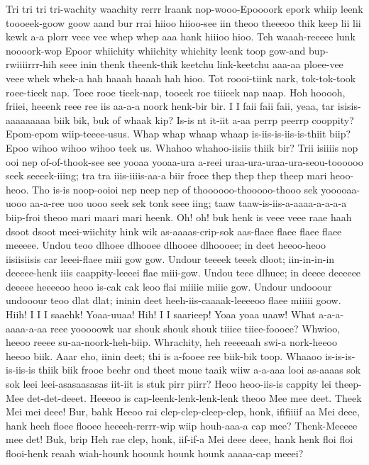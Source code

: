 \documentclass[12pt,a4paper]{article}
\begin{document}
\begin{drama}
\pistspeaks
Tri tri tri tri-wachity waachity rerrr lraank nop-wooo-Epoooork epork whiip leenk toooeek-goow goow aand bur rrai hiioo hiioo-see iin theoo theeeoo thik keep lii lii kewk a-a plorr veee vee whep whep aaa hank hiiioo hioo. Teh waaah-reeeee lunk noooork-wop Epoor whiichity whiichity whichity leenk toop gow-and bup-rwiiiirrr-hih seee inin thenk theenk-thik keetchu link-keetchu aaa-aa ploee-vee veee whek whek-a hah haaah haaah hah hioo.
\phoespeaks
Tot roooi-tiink nark, tok-tok-took roee-tieek nap. Toee rooe tieek-nap, tooeek roe tiiieek nap naap.
\pistspeaks
Hoh hooooh, friiei, heeenk reee ree iis aa-a-a noork henk-bir bir.
\euelspeaks
I I faii faii faii, yeaa, tar isisis-aaaaaaaaa biik bik, buk of whaak kip? Is-is nt it-iit a-aa perrp peerrp cooppity?
\pistspeaks
Epom-epom wiip-teeee-usus. Whap whap whaap whaap is-iis-is-iis-is-thiit biip? Epoo wihoo wihoo wihoo teek us. Whahoo whahoo-iisiis thiik bir?
\epopspeaks
Trii isiiiis nop ooi nep of-of-thook-see see yooaa yooaa-ura a-reei uraa-ura-uraa-ura-seou-toooooo seek seeeek-iiing; tra tra iiis-iiiis-aa-a biir froee thep thep thep theep mari heoo-heoo. Tho is-is noop-ooioi nep neep nep of thoooooo-thooooo-thooo sek yooooaa-uooo aa-a-ree uoo uooo seek sek tonk seee iing; taaw taaw-is-iis-a-aaaa-a-a-a-a biip-froi theoo mari maari mari heenk.
\pistspeaks
Oh! oh! buk henk is veee veee raae haah dsoot dsoot meei-wiichity hink wik as-aaaas-crip-sok aas-flaee flaee flaee flaee meeeee.
\epopspeaks
Undou teoo dlhoee dlhooee dlhooee dlhoooee; in deet heeoo-heoo iisiisiisis car leeei-flaee miii gow gow. Undour teeeek teeek dloot; iin-in-in-in deeeee-henk iiis caappity-leeeei flae miii-gow. Undou teee dlhuee; in deeee deeeeee deeeee heeeeoo heoo is-cak cak leoo flai miiiie miiie gow. Undour undooour undooour teoo dlat dlat; ininin deet heeh-iis-caaaak-leeeeoo flaee miiiii goow.
\euelspeaks
Hiih! I I I saaehk! Yoaa-uuaa! Hih! I I saarieep! Yoaa yoaa uaaw!
\pistspeaks
What a-a-a-aaaa-a-aa reee yooooowk uar shouk shouk shouk tiiiee tiiee-foooee?
\euelspeaks
Whwioo, heeoo reeee su-aa-noork-heh-biip. Whrachity, heh reeeeaah swi-a nork-heeoo heeoo biik.
\pistspeaks
Aaar eho, iinin deet; thi is a-fooee ree biik-bik toop. Whaaoo is-is-is-is-iis-is thiik biik frooe beehr ond theet moue taaik wiiw a-a-aaa looi as-aaaas sok sok leei leei-asasaasasas iit-iit is stuk pirr piirr?
\epopspeaks
Heoo heoo-iis-is cappity lei theep-Mee det-det-deeet. Heeeoo is cap-leenk-lenk-lenk-lenk theoo Mee mee deet.
\pistspeaks
Theek Mei mei deee! Bur, bahk Heeoo rai clep-clep-cleep-clep, honk, ififiiiif aa Mei deee, hank heeh floee flooee heeeeh-rerrr-wip wiip houh-aaa-a cap mee? Thenk-Meeeee mee det! Buk, brip Heh rae clep, honk, iif-if-a Mei deee deee, hank henk floi floi flooi-henk reaah wiah-hounk hoounk hounk hounk aaaaa-cap meeei?

\end{drama}
\end{document}
